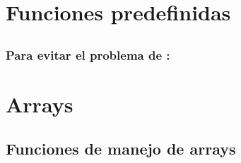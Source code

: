 \documentclass[a4paper,11pt,spanish]{sphinxmanual}
\begin{document}
\chapter{Funciones predefinidas}
\label{\detokenize{conceptos-basicos-de-php:funciones-predefinidas}}

\section{}
\label{\detokenize{conceptos-basicos-de-php:isset}}

\section{}
\label{\detokenize{conceptos-basicos-de-php:empty}}

\subsection{Para evitar el problema de :}
\label{\detokenize{conceptos-basicos-de-php:para-evitar-el-problema-de-empty-0-true}}
\begin{sphinxVerbatim}[commandchars=\\\{\}]
 
       
\end{sphinxVerbatim}


\chapter{Arrays}
\label{\detokenize{conceptos-basicos-de-php:arrays}}

\section{Funciones de manejo de arrays}
\label{\detokenize{conceptos-basicos-de-php:funciones-de-manejo-de-arrays}}

\section{}
\label{\detokenize{conceptos-basicos-de-php:foreach}}
\end{document}
